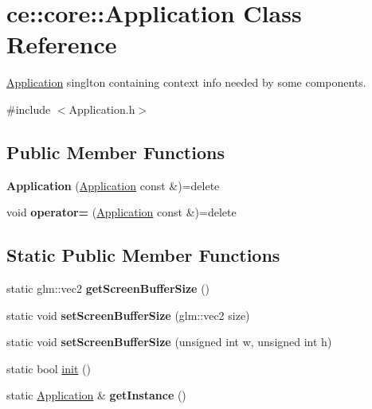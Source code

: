 \hypertarget{classce_1_1core_1_1_application}{}\section{ce\+:\+:core\+:\+:Application Class Reference}
\label{classce_1_1core_1_1_application}


\hyperlink{classce_1_1core_1_1_application}{Application} singlton containing context info needed by some components.  




{\ttfamily \#include $<$Application.\+h$>$}

\subsection*{Public Member Functions}
\begin{DoxyCompactItemize}
\item 
\mbox{\label{classce_1_1core_1_1_application_a8e18666e2174bb3bbc372a9370e41870}} 
{\bfseries Application} (\hyperlink{classce_1_1core_1_1_application}{Application} const \&)=delete
\item 
\mbox{\label{classce_1_1core_1_1_application_aff549aad9b728fa601c5620df6ad2968}} 
void {\bfseries operator=} (\hyperlink{classce_1_1core_1_1_application}{Application} const \&)=delete
\end{DoxyCompactItemize}
\subsection*{Static Public Member Functions}
\begin{DoxyCompactItemize}
\item 
\mbox{\label{classce_1_1core_1_1_application_a02eadc7f3baf9e2b6a4afaeb70fd6870}} 
static glm\+::vec2 {\bfseries get\+Screen\+Buffer\+Size} ()
\item 
\mbox{\label{classce_1_1core_1_1_application_a607e77350ed31db6c4463c2ec048fd73}} 
static void {\bfseries set\+Screen\+Buffer\+Size} (glm\+::vec2 size)
\item 
\mbox{\label{classce_1_1core_1_1_application_a4e6f45381a3a3f7c6e9ef76446c9ea1c}} 
static void {\bfseries set\+Screen\+Buffer\+Size} (unsigned int w, unsigned int h)
\item 
static bool \hyperlink{classce_1_1core_1_1_application_ad93435a68fa6eb317d85a3465f45d0d5}{init} ()
\item 
\mbox{\label{classce_1_1core_1_1_application_aa2b9f2c00cdebf63ead970bff2e58519}} 
static \hyperlink{classce_1_1core_1_1_application}{Application} \& {\bfseries get\+Instance} ()
\end{DoxyCompactItemize}
